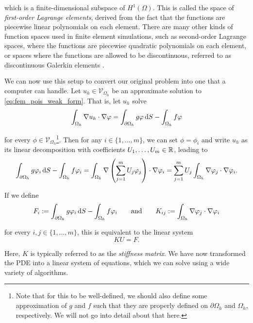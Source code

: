 \noindent
which is a finite-dimensional subspace of $H^1(\Omega)$. This is called the space of \emph{first-order Lagrange elements}, derived from the fact that the functions are piecewise linear polynomials on each element. There are many other kinds of function spaces used in finite element simulations, such as second-order Lagrange spaces, where the functions are piecewise quadratic polynomials on each element, or spaces where the functions are allowed to be discontinuous, referred to as discontinuous Galerkin elements \cite{cockburn97}.

We can now use this setup to convert our original problem into one that a computer can handle. Let $u_h \in \mathcal{V}_{\Omega_h}$ be an approximate solution to \cref{eq:fem_pois_weak_form}. That is, let $u_h$ solve
%
\begin{equation*}
    \int_{\Omega_h} \nabla u_h \cdot \nabla \varphi = \int_{\partial \Omega_h} g \varphi \mathop{}\!\mathrm{d} S - \int_{\Omega_h} f \varphi
\end{equation*}

\noindent
for every $\phi \in \mathcal{V}_{\Omega_h}$\footnote{Note that for this to be well-defined, we should also define some approximation of $g$ and $f$ such that they are properly defined on $\partial \Omega_h$ and $\Omega_h$, respectively. We will not go into detail about that here.}. Then for any $i \in \{ 1, \dots, m \}$, we can set $\phi = \phi_i$ and write $u_h$ as its linear decomposition with coefficients $U_1, \dots, U_m \in \mathbb{R}$, leading to
%
\begin{equation*}
    \int_{\partial \Omega_h} g \varphi_i  \mathop{}\!\mathrm{d} S - \int_{\Omega_h} f \varphi_i = \int_{\Omega_h} \nabla \left( \sum_{j = 1}^{m} U_j \varphi_j \right) \cdot \nabla \varphi_i = \sum_{j = 1}^{m} U_j \int_{\Omega_h} \nabla \varphi_j \cdot \nabla \varphi_i .
\end{equation*}

\noindent
If we define
%
\begin{equation*}
    F_i :=  \int_{\partial \Omega_h} g \varphi_i  \mathop{}\!\mathrm{d} S - \int_{\Omega_h} f \varphi_i \qquad \text{and} \qquad K_{ij} := \int_{\Omega_h} \nabla \varphi_j \cdot \nabla \varphi_i
\end{equation*}

\noindent
for every $i, j \in \{1, \dots, m\}$, this is equivalent to the linear system
%
\begin{equation}
    KU = F.
\end{equation}

\noindent
Here, $K$ is typically referred to as the \emph{stiffness matrix}. We have now transformed the PDE into a linear system of equations, which we can solve using a wide variety of algorithms.

